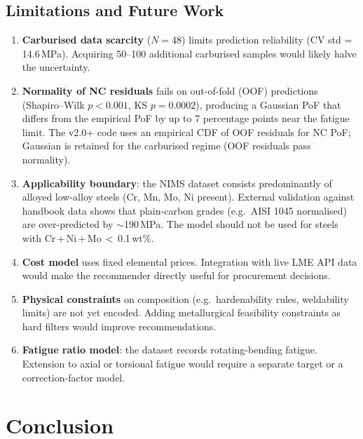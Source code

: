 \documentclass[12pt,a4paper]{article}
\begin{document}
\subsection{Limitations and Future Work}

\begin{enumerate}[nosep]
  \item \textbf{Carburised data scarcity} ($N=48$) limits prediction reliability
        (CV std = 14.6\,MPa). Acquiring 50--100 additional carburised samples would likely halve
        the uncertainty.
  \item \textbf{Normality of NC residuals} fails on out-of-fold (OOF) predictions
        (Shapiro--Wilk $p < 0.001$, KS $p = 0.0002$), producing a Gaussian PoF that differs
        from the empirical PoF by up to 7 percentage points near the fatigue limit.
        The v2.0+ code uses an empirical CDF of OOF residuals for NC PoF; Gaussian is retained
        for the carburised regime (OOF residuals pass normality).
  \item \textbf{Applicability boundary}: the NIMS dataset consists predominantly of
        alloyed low-alloy steels (Cr, Mn, Mo, Ni present). External validation against
        handbook data shows that plain-carbon grades (e.g.\ AISI 1045 normalised) are
        over-predicted by $\sim$190\,MPa. The model should not be used for steels with
        Cr\,+\,Ni\,+\,Mo\,$<$\,0.1\,wt\%.
  \item \textbf{Cost model} uses fixed elemental prices. Integration with live LME API data
        would make the recommender directly useful for procurement decisions.
  \item \textbf{Physical constraints} on composition (e.g.\ hardenability rules, weldability
        limits) are not yet encoded. Adding metallurgical feasibility constraints as hard filters
        would improve recommendations.
  \item \textbf{Fatigue ratio model}: the dataset records rotating-bending fatigue. Extension
        to axial or torsional fatigue would require a separate target or a correction-factor model.
\end{enumerate}


\section{Conclusion}
\end{document}
